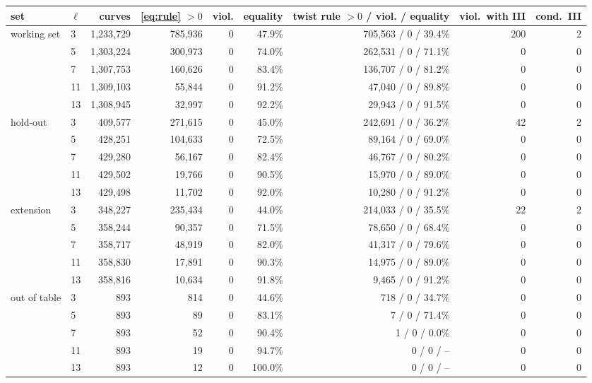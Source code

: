 \begin{tabular}{llrrrrrrr}
\toprule
set & $\ell$ & curves & \eqref{eq:rule} $>0$ & viol. & equality & twist rule $>0$ / viol. / equality & viol.\ with III & cond.\ III\\
\midrule
working set & 3 & 1,233,729 & 785,936 & 0 & 47.9\% & 705,563 / 0 / 39.4\% & 200 & 2 \\
 & 5 & 1,303,224 & 300,973 & 0 & 74.0\% & 262,531 / 0 / 71.1\% & 0 & 0 \\
 & 7 & 1,307,753 & 160,626 & 0 & 83.4\% & 136,707 / 0 / 81.2\% & 0 & 0 \\
 & 11 & 1,309,103 & 55,844 & 0 & 91.2\% & 47,040 / 0 / 89.8\% & 0 & 0 \\
 & 13 & 1,308,945 & 32,997 & 0 & 92.2\% & 29,943 / 0 / 91.5\% & 0 & 0 \\
\midrule
hold-out & 3 & 409,577 & 271,615 & 0 & 45.0\% & 242,691 / 0 / 36.2\% & 42 & 2 \\
 & 5 & 428,251 & 104,633 & 0 & 72.5\% & 89,164 / 0 / 69.0\% & 0 & 0 \\
 & 7 & 429,280 & 56,167 & 0 & 82.4\% & 46,767 / 0 / 80.2\% & 0 & 0 \\
 & 11 & 429,502 & 19,766 & 0 & 90.5\% & 15,970 / 0 / 89.0\% & 0 & 0 \\
 & 13 & 429,498 & 11,702 & 0 & 92.0\% & 10,280 / 0 / 91.2\% & 0 & 0 \\
\midrule
extension & 3 & 348,227 & 235,434 & 0 & 44.0\% & 214,033 / 0 / 35.5\% & 22 & 2 \\
 & 5 & 358,244 & 90,357 & 0 & 71.5\% & 78,650 / 0 / 68.4\% & 0 & 0 \\
 & 7 & 358,717 & 48,919 & 0 & 82.0\% & 41,317 / 0 / 79.6\% & 0 & 0 \\
 & 11 & 358,830 & 17,891 & 0 & 90.3\% & 14,975 / 0 / 89.0\% & 0 & 0 \\
 & 13 & 358,816 & 10,634 & 0 & 91.8\% & 9,465 / 0 / 91.2\% & 0 & 0 \\
\midrule
out of table & 3 & 893 & 814 & 0 & 44.6\% & 718 / 0 / 34.7\% & 0 & 0 \\
 & 5 & 893 & 89 & 0 & 83.1\% & 7 / 0 / 71.4\% & 0 & 0 \\
 & 7 & 893 & 52 & 0 & 90.4\% & 1 / 0 / 0.0\% & 0 & 0 \\
 & 11 & 893 & 19 & 0 & 94.7\% & 0 / 0 / -- & 0 & 0 \\
 & 13 & 893 & 12 & 0 & 100.0\% & 0 / 0 / -- & 0 & 0 \\
\midrule
\bottomrule
\end{tabular}
